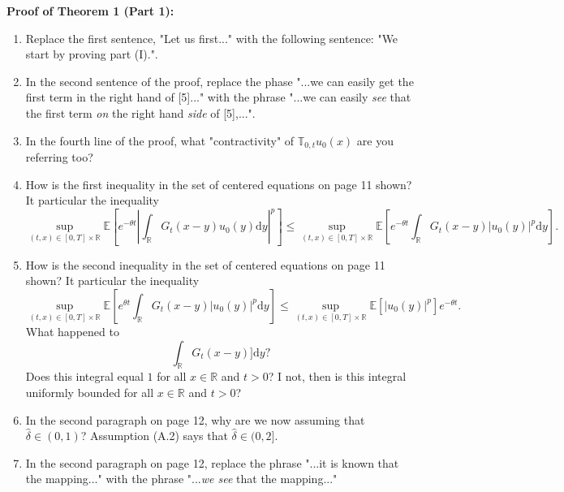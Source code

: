\documentclass[a4paper,11pt]{article}
\numberwithin{equation}{section}
\numberwithin{equation}{section}
\theoremstyle{plain}
\theoremstyle{definition}
\newcommand{\ud}{\ensuremath{\mathrm{d} }}
\newcommand{\R}{\mathbb{R}}
\begin{document}
\textbf{Proof of Theorem 1 (Part 1):} 
\begin{enumerate}
	\item 
Replace the first sentence, "Let us first..." with the following sentence: "We start by proving part (I).". 
	
	\item 
In the second sentence of the proof, replace the phase "...we can easily get the first term in the right hand of [5]..." with the phrase "...we can easily \textit{see} that the first term \textit{on} the right hand \textit{side} of [5],...".
	
	\item
In the fourth line of the proof, what "contractivity" of $\mathbb{T}_{0,t}u_0(x)$ are you referring too? 

	\item 
How is the first inequality in the set of centered equations on page 11 shown? It particular the inequality 
	\[
		\sup_{(t,x)\in[0,T]\times \R} \mathbb{E}\left[ e^{-\theta t} \left|\int_{\R} G_t(x-y)u_0(y) \ud y \right|^p \right] \le \sup_{(t,x)\in[0,T]\times \R} \mathbb{E}\left[ e^{-\theta t} \int_{\R} G_t(x-y)|u_0(y)|^p \ud y  \right].
	\]
	 
	\item
How is the second inequality in the set of centered equations on page 11 shown? It particular the inequality
	\[
		\sup_{(t,x)\in[0,T]\times \R} \mathbb{E}\left[ e^{\theta t} \int_{\R} G_t(x-y)|u_0(y)|^p \ud y \right]  \le \sup_{(t,x)\in[0,T]\times \R} \mathbb{E}\left[|u_0(y)|^p\right]e^{-\theta t}.
	\]
What happened to 
\[
\int_{\R}G_t(x-y) ]\ud y ?
\]
Does this integral equal $1$ for all $x \in \R$ and $t>0$? I not, then is this integral uniformly bounded for all $x \in \R$ and $t>0$? 

	\item 
In the second paragraph on page 12, why are we now assuming that $\hat{\delta} \in (0,1)$? Assumption (A.2) says that $\hat{\delta} \in (0,2]$. 

	\item 
In the second paragraph on page 12, replace the phrase "...it is known that the mapping..." with the phrase "...\textit{we see} that the mapping..."
\end{enumerate}
\end{document}

